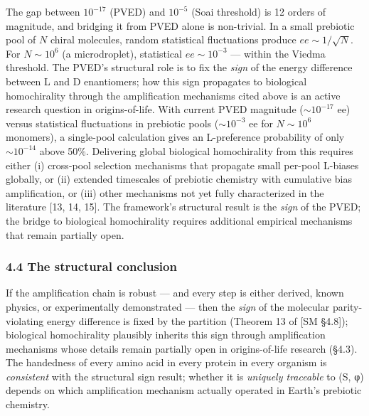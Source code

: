 \documentclass[
]{article}
\begin{document}
The gap between \(10^{-17}\) (PVED) and \(10^{-5}\) (Soai threshold) is
12 orders of magnitude, and bridging it from PVED alone is non-trivial.
In a small prebiotic pool of \(N\) chiral molecules, random statistical
fluctuations produce \(ee \sim 1/\sqrt{N}\). For \(N \sim 10^6\) (a
microdroplet), statistical \(ee \sim 10^{-3}\) --- within the Viedma
threshold. The PVED's structural role is to fix the \emph{sign} of the
energy difference between L and D enantiomers; how this sign propagates
to biological homochirality through the amplification mechanisms cited
above is an active research question in origins-of-life. With current
PVED magnitude (\(\sim 10^{-17}\) ee) versus statistical fluctuations in
prebiotic pools (\(\sim 10^{-3}\) ee for \(N \sim 10^6\) monomers), a
single-pool calculation gives an L-preference probability of only
\(\sim 10^{-14}\) above 50\%. Delivering global biological homochirality
from this requires either (i) cross-pool selection mechanisms that
propagate small per-pool L-biases globally, or (ii) extended timescales
of prebiotic chemistry with cumulative bias amplification, or (iii)
other mechanisms not yet fully characterized in the literature {[}13,
14, 15{]}. The framework's structural result is the \emph{sign} of the
PVED; the bridge to biological homochirality requires additional
empirical mechanisms that remain partially open.

\hypertarget{the-structural-conclusion}{%
\subsubsection{4.4 The structural
conclusion}\label{the-structural-conclusion}}

If the amplification chain is robust --- and every step is either
derived, known physics, or experimentally demonstrated --- then the
\emph{sign} of the molecular parity-violating energy difference is fixed
by the partition (Theorem 13 of {[}SM §4.8{]}); biological homochirality
plausibly inherits this sign through amplification mechanisms whose
details remain partially open in origins-of-life research (§4.3). The
handedness of every amino acid in every protein in every organism is
\emph{consistent} with the structural sign result; whether it is
\emph{uniquely traceable} to (S, φ) depends on which amplification
mechanism actually operated in Earth's prebiotic chemistry.
\end{document}
